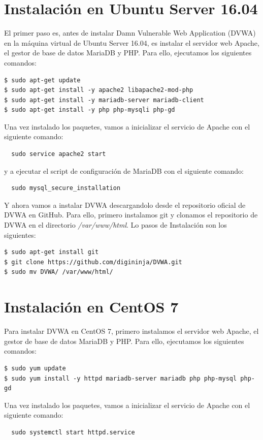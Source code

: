 \documentclass[11pt]{report}
\begin{document}
\section{Instalación en Ubuntu Server 16.04}
El primer paso es, antes de instalar Damn Vulnerable Web Application (DVWA) en la máquina virtual de Ubuntu Server 16.04,
es instalar el servidor web Apache, el gestor de base de datos MariaDB y PHP. Para ello, ejecutamos
los siguientes comandos:
\begin{verbatim}
$ sudo apt-get update
$ sudo apt-get install -y apache2 libapache2-mod-php
$ sudo apt-get install -y mariadb-server mariadb-client 
$ sudo apt-get install -y php php-mysqli php-gd 
\end{verbatim}

Una vez instalado los paquetes, vamos a inicializar el servicio de Apache con el siguiente comando:
\begin{BVerbatim}
  sudo service apache2 start
\end{BVerbatim}

y a ejecutar el script de configuración de MariaDB con el siguiente comando:
\begin{BVerbatim}
  sudo mysql_secure_installation
\end{BVerbatim}

Y ahora vamos a instalar DVWA descargandolo desde el repositorio oficial de DVWA en GitHub. Para ello, primero instalamos git y clonamos el repositorio de DVWA en el directorio
\emph{/var/www/html}. Lo pasos de Instalación son los siguientes:
\begin{verbatim}
$ sudo apt-get install git
$ git clone https://github.com/digininja/DVWA.git
$ sudo mv DVWA/ /var/www/html/
\end{verbatim}

\section{Instalación en CentOS 7}
Para instalar DVWA en CentOS 7, primero instalamos el servidor web Apache, el gestor de base de datos MariaDB y PHP. Para ello, ejecutamos
los siguientes comandos:
\begin{verbatim}
$ sudo yum update
$ sudo yum install -y httpd mariadb-server mariadb php php-mysql php-gd
\end{verbatim}

Una vez instalado los paquetes, vamos a inicializar el servicio de Apache con el siguiente comando:
\begin{BVerbatim}
  sudo systemctl start httpd.service
\end{BVerbatim}
\end{document}
